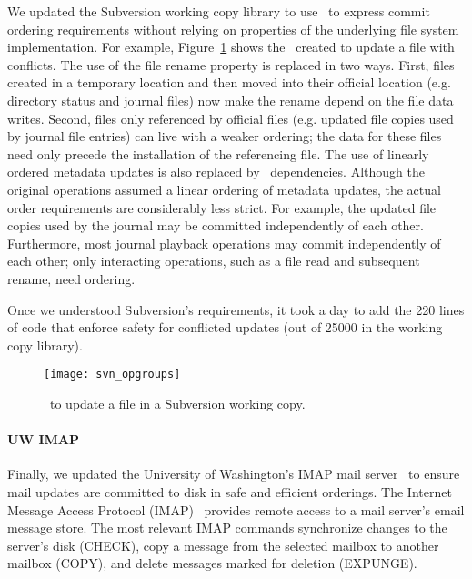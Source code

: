 We updated the Subversion working copy library to use \patchgroups\ to
express commit ordering requirements
without relying on properties of the
underlying file system implementation.
%
For example, Figure~\ref{fig:svn-order} shows the \patchgroups\ created to update a
file with conflicts.
%
The use of the file rename property is replaced in two ways.
%
First, files created in a temporary location and then moved into their
official location (e.g. directory status and journal files) now
make the rename depend on the file data writes.
%
Second, files only referenced by official files (e.g. updated file
copies used by journal file entries) can live with a weaker ordering;
the data for these files need only precede the installation of the
referencing file.
%
The use of linearly ordered metadata updates is also replaced by
\patchgroup\ dependencies.
%
Although the original operations assumed a linear ordering of metadata
updates, the actual order requirements are considerably less strict.
%
For example, the updated file copies used by the journal may be
committed independently of each other.
%
Furthermore, most journal playback operations may commit
independently of each other; only interacting operations, such as a
file read and subsequent rename, need ordering.

Once we understood Subversion's requirements, it took a day to add
the 220 lines of code that enforce safety for conflicted updates (out of
25000 in the working copy library).

\begin{figure}[t]
  \centering
  \texttt{[image: svn\_opgroups]}
  \caption{\Patchgroups\ to update a file in a Subversion working copy.}
  \label{fig:svn-order}
\end{figure}

\paragraph{UW IMAP}
\label{sec:patchgroup:uwimap}

Finally, we updated the University of Washington's IMAP mail server~\cite{uwimap} to
ensure mail updates are committed to disk
in safe and efficient orderings.
%
The Internet Message Access Protocol (IMAP)~\cite{rfc3501} provides
remote access to a mail server's email message store.
%
The most relevant IMAP commands synchronize changes to the server's
disk (CHECK), copy a message from the selected mailbox to another
mailbox (COPY), and delete messages marked for deletion (EXPUNGE).

